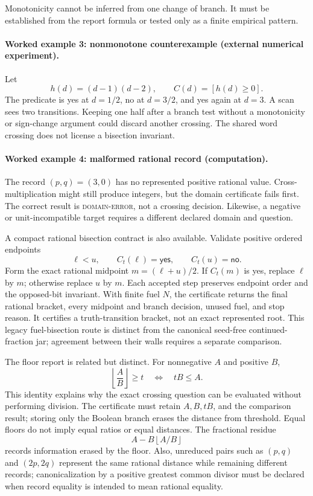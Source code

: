 Monotonicity cannot be inferred from one change of branch.  It must be established from the report formula or tested
only as a finite empirical pattern.

\paragraph{Worked example 3: nonmonotone counterexample (external numerical experiment).}
Let
\[
                         h(d)=(d-1)(d-2),
 \qquad C(d)=[h(d)\ge0].
\]
The predicate is yes at \(d=1/2\), no at \(d=3/2\), and yes again at \(d=3\).  A scan sees two transitions.  Keeping one
half after a branch test without a monotonicity or sign-change argument could discard another crossing.  The shared word
crossing does not license a bisection invariant.

\paragraph{Worked example 4: malformed rational record (computation).}
The record \((p,q)=(3,0)\) has no represented positive rational value.  Cross-multiplication might still produce
integers, but the domain certificate fails first.  The correct result is \textsc{domain-error}, not a crossing decision.
Likewise, a negative or unit-incompatible target requires a different declared domain and question.

A compact rational bisection contract is also available.  Validate positive ordered endpoints
\[
 \ell<u,\qquad C_t(\ell)=\mathsf{yes},\qquad C_t(u)=\mathsf{no}.
\]
Form the exact rational midpoint \(m=(\ell+u)/2\).  If \(C_t(m)\) is yes, replace \(\ell\) by \(m\); otherwise replace
\(u\) by \(m\).  Each accepted step preserves endpoint order and the opposed-bit invariant.  With finite fuel \(N\),
the certificate returns the final rational bracket, every midpoint and branch decision, unused fuel, and stop reason.
It certifies a truth-transition bracket, not an exact represented root.  This legacy fuel-bisection route is distinct
from the canonical seed-free continued-fraction jar; agreement between their walls requires a separate comparison.

The floor report is related but distinct.  For nonnegative \(A\) and positive \(B\),
\[
                         \left\lfloor\frac AB\right\rfloor\ge t
 \quad\Longleftrightarrow\quad
                         tB\le A.
\]
This identity explains why the exact crossing question can be evaluated without performing division.  The certificate
must retain \(A,B,tB\), and the comparison result; storing only the Boolean branch erases the distance from threshold.
Equal floors do not imply equal ratios or equal distances.  The fractional residue
\[
                         A-B\left\lfloor A/B\right\rfloor
\]
records information erased by the floor.  Also, unreduced pairs such as \((p,q)\) and \((2p,2q)\) represent the same
rational distance while remaining different records; canonicalization by a positive greatest common divisor must be
declared when record equality is intended to mean rational equality.


